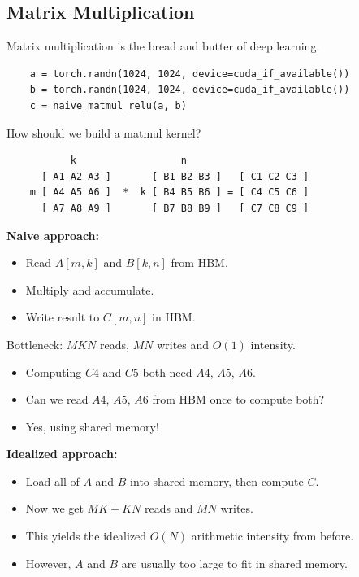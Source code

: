 \documentclass[12pt,twoside]{article}
\begin{document}
\subsection*{Matrix Multiplication}

Matrix multiplication is the bread and butter of deep learning.

\begin{verbatim}
    a = torch.randn(1024, 1024, device=cuda_if_available())
    b = torch.randn(1024, 1024, device=cuda_if_available())
    c = naive_matmul_relu(a, b)
\end{verbatim}

How should we build a matmul kernel?

\begin{verbatim}
           k                  n                      
      [ A1 A2 A3 ]       [ B1 B2 B3 ]   [ C1 C2 C3 ]
    m [ A4 A5 A6 ]  *  k [ B4 B5 B6 ] = [ C4 C5 C6 ]
      [ A7 A8 A9 ]       [ B7 B8 B9 ]   [ C7 C8 C9 ]
\end{verbatim}

\textbf{Naive approach:}

\begin{itemize}
    \item Read \(A[m, k]\) and \(B[k, n]\) from HBM.
    \item Multiply and accumulate.
    \item Write result to \(C[m, n]\) in HBM.
\end{itemize}

Bottleneck: \(MKN\) reads, \(MN\) writes and \(O(1)\) intensity.

\begin{itemize}
    \item Computing \(C4\) and \(C5\) both need \(A4\), \(A5\), \(A6\).
    \item Can we read \(A4\), \(A5\), \(A6\) from HBM once to compute both?
    \item Yes, using shared memory!
\end{itemize}

\textbf{Idealized approach:}

\begin{itemize}
    \item Load all of \(A\) and \(B\) into shared memory, then compute \(C\).
    \item Now we get \(MK + KN\) reads and \(MN\) writes.
    \item This yields the idealized \(O(N)\) arithmetic intensity from before.
    \item However, \(A\) and \(B\) are usually too large to fit in shared memory.
\end{itemize}
\end{document}
